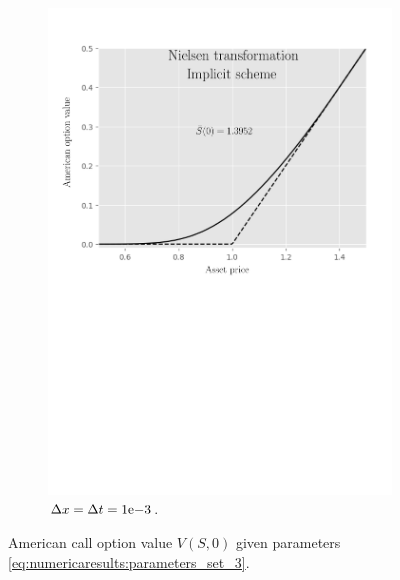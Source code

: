 \begin{figure}[H]
\begin{subfigure}{0.4\textwidth}
    \includegraphics[width=\textwidth]{chapters/chapter3/TestCase3ImplicitNielsen.pdf}
    \caption{$\Delta{x}=\Delta{t}={1}\mathrm{e}{-3}$.}
  \end{subfigure}
  \caption{American call option value $V(S, 0)$ given parameters \eqref{eq:numericaresults:parameters_set_3}.}
  \label{fig:finitedifferencesschemes:numericaresults:test_case_3}
\end{figure}
